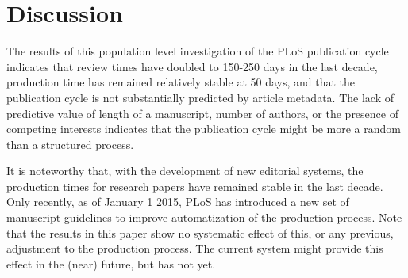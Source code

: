 \section*{Discussion}
The results of this population level investigation of the PLoS publication cycle indicates that review times have doubled to 150-250 days in the last decade, production time has remained relatively stable at 50 days, and that the publication cycle is not substantially predicted by article metadata. The lack of predictive value of length of a manuscript, number of authors, or the presence of competing interests indicates that the publication cycle might be more a random than a structured process. 

It is noteworthy that, with the development of new editorial systems, the production times for research papers have remained stable in the last decade. Only recently, as of January 1 2015, PLoS has introduced a new set of manuscript guidelines to improve automatization of the production process. Note that the results in this paper show no systematic effect of this, or any previous, adjustment to the production process. The current system might provide this effect in the (near) future, but has not yet.

